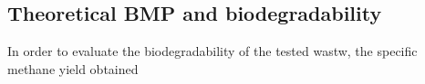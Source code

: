 \subsection{Theoretical BMP and biodegradability}
In order to evaluate the biodegradability of the tested wastw, the specific methane yield obtained 
